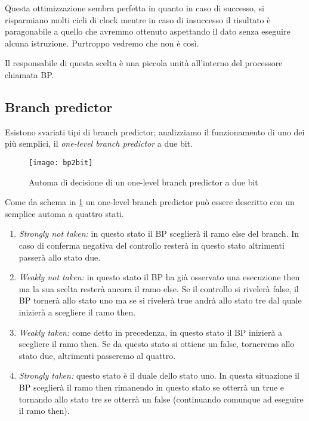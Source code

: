 		Questa ottimizzazione sembra perfetta in quanto in caso di successo, si risparmiano molti cicli di clock mentre in caso di insuccesso il risultato è paragonabile a quello che avremmo ottenuto aspettando il dato senza eseguire alcuna istruzione. Purtroppo vedremo che non è così.
		
		Il responsabile di questa scelta è una piccola unità all'interno del processore chiamata \ac{BP}.
		
		\subsection{Branch predictor}
			Esistono svariati tipi di branch predictor; analizziamo il funzionamento di uno dei più semplici, il \emph{one-level branch predictor} a due bit.
			
			\begin{figure}
				\begin{center}
					\texttt{[image: bp2bit]}
					\caption{Automa di decisione di un one-level branch predictor a due bit}
					\label{fig:bp2bits}
				\end{center}
			\end{figure}
		
			Come da schema in \cref{fig:bp2bits} un one-level branch predictor può essere descritto con un semplice automa a quattro stati.
			
			\begin{enumerate}
				\item \emph{Strongly not taken:} in questo stato il \ac{BP} sceglierà il ramo else del branch. In caso di conferma negativa del controllo resterà in questo stato altrimenti passerà allo stato due.
				\item \emph{Weakly not taken:} in questo stato il \ac{BP} ha già osservato una esecuzione then ma la sua scelta resterà ancora il ramo else. Se il controllo si rivelerà false, il \ac{BP} tornerà allo stato uno ma se si rivelerà true andrà allo stato tre dal quale inizierà a scegliere il ramo then.
				\item \emph{Weakly taken:} come detto in precedenza, in questo stato il \ac{BP} inizierà a scegliere il ramo then. Se da questo stato si ottiene un false, torneremo allo stato due, altrimenti passeremo al quattro.
				\item \emph{Strongly taken:} questo stato è il duale dello stato uno. In questa situazione il \ac{BP} sceglierà il ramo then rimanendo in questo stato se otterrà un true e tornando allo stato tre se otterrà un false (continuando comunque ad eseguire il ramo then).
			\end{enumerate}
		
